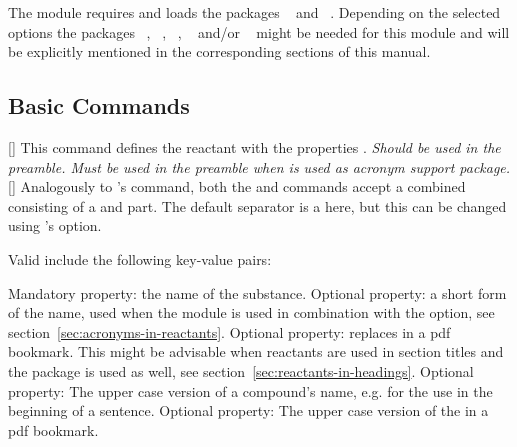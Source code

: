 \documentclass{chemmacros-manual}
\begin{document}
The module requires and loads the packages ~\cite{pkg:chemnum}
and ~\cite{pkg:siunitx}. Depending on the selected options the
packages ~\cite{pkg:acro},
~\cite{pkg:glossaries-extra},
~\cite{pkg:hyperref}, ~\cite{pkg:longtable}
and/or ~\cite{pkg:xltabular} might be needed for this module
and will be explicitly mentioned in the corresponding sections of this manual.

\subsection{Basic Commands}

\begin{commands}
  []
    This command defines the reactant  with the properties
    .  \emph{Should be used in the preamble. Must be used in
      the preamble when  is used as acronym support package.}
  []
    Analogously to 's  command, both the
     and  commands accept a combined
     consisting of a  and  part. The
    default separator is a  here, but this can be changed using
    's  option.
\end{commands}
Valid  include the following key-value pairs:
\begin{options}
    Mandatory property: the name of the substance.
    Optional property: a short form of the name, used when the
     module is used in combination with the
     option, see section~\vref{sec:acronyms-in-reactants}.
    Optional property: replaces  in a \ac{pdf} bookmark.  This
    might be advisable when reactants are used in section titles and the
     package is used as well, see
    section~\vref{sec:reactants-in-headings}.
    Optional property: The upper case version of a compound's name, e.g. for
    the use in the beginning of a sentence.
    Optional property: The upper case version of the  in a \ac{pdf} bookmark.
\end{options}
\end{document}
